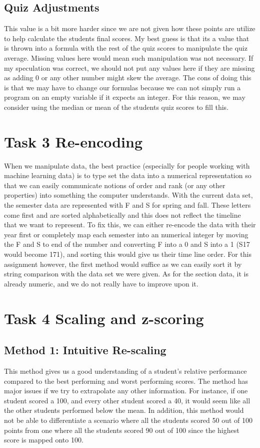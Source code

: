 \documentclass{article}
\begin{document}
\subsection{Quiz Adjustments}
This value is a bit more harder since we are not given how these points are utilize to help calculate the students final scores. My best guess is that its a value that is thrown into a formula with the rest of the quiz scores to manipulate the quiz average. Missing values here would mean such manipulation was not necessary. If my speculation was correct, we should not put any values here if they are missing as adding 0 or any other number might skew the average. The cons of doing this is that we may have to change our formulas because we can not simply run a program on an empty variable if it expects an integer. For this reason, we may consider using the median or mean of the students quiz scores to fill this. 

\section{Task 3 Re-encoding}
When we manipulate data, the best practice (especially for people working with machine learning data) is to type set the data into a numerical representation so that we can easily communicate notions of order and rank (or any other properties) into something the computer understands. With the current data set, the semester data are represented with F and S for spring and fall. These letters come first and are sorted alphabetically and this does not reflect the timeline that we want to represent. To fix this, we can either re-encode the data with their year first or completely map each semester into an numerical integer by moving the F and S to end of the number and converting F into a 0 and S into a 1 (S17 would become 171), and sorting this would give us their time line order. For this assignment however, the first method would suffice as we can easily sort it by string comparison with the data set we were given. As for the section data, it is already numeric, and we do not really have to improve upon it.

\section{Task 4 Scaling and z-scoring}
\subsection{Method 1: Intuitive Re-scaling}
This method gives us a good understanding of a student's relative performance compared to the best performing and worst performing scores. The method has major issues if we try to extrapolate any other information. For instance, if one student scored a 100, and every other student scored a 40, it would seem like all the other students performed below the mean. In addition, this method would not be able to differentiate a scenario where all the students scored 50 out of 100 points from one where all the students scored 90 out of 100 since the highest score is mapped onto 100.
\end{document}
